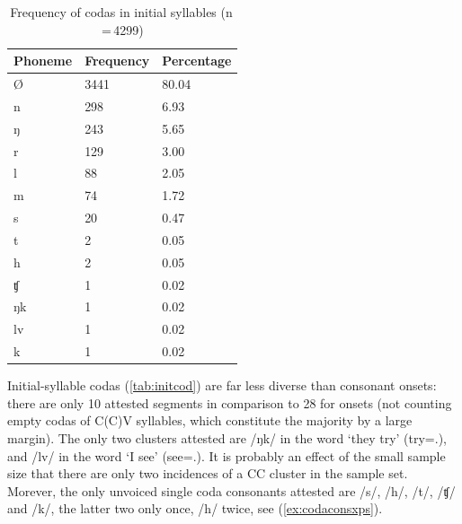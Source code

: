 \begin{table}\centering
\caption[Frequency of codas in initial syllables]{Frequency of codas in initial
syllables (n\,=\,4299)}
\begin{tabu} to 0.67\linewidth{X X[c] X[c]}
\tableheaderfont\toprule
Phoneme
	& Frequency
	& Percentage
	\\
	
\toprule

Ø
	& 3441
	& 80.04\pct
	\\

\midrule

n
	& 298
	& 6.93\pct
	\\

ŋ
	& 243
	& 5.65\pct
	\\

r
	& 129
	& 3.00\pct
	\\

l
	& 88
	& 2.05\pct
	\\

m
	& 74
	& 1.72\pct
	\\

s
	& 20
	& 0.47\pct
	\\

t
	& 2
	& 0.05\pct
	\\

h
	& 2
	& 0.05\pct
	\\
	
ʧ
	& 1
	& 0.02\pct
	\\

ŋk
	& 1
	& 0.02\pct
	\\

lv
	& 1
	& 0.02\pct
	\\

k
	& 1
	& 0.02\pct
	\\

\bottomrule
\end{tabu}
\label{tab:initcod}
\end{table}

Initial-syllable codas (\autoref{tab:initcod}) are far less diverse than
consonant onsets: there are only 10 attested segments in comparison to 28 for
onsets (not counting empty codas of C(C)V syllables, which constitute the
majority by a large margin). The only two clusters attested are /ŋk/ in the
word  `they try' (try=\TplM{}.\Aarg{}), and /lv/ in
the word  `I see' (see=\Fpl{}.\Aarg{}). It is
probably an effect of the small sample size that there are only two incidences
of a CC cluster in the sample set. Morever, the only unvoiced single coda
consonants attested are /s/, /h/, /t/, /ʧ/ and /k/, the latter two only once,
/h/ twice, see (\ref{ex:codaconsxps}).

